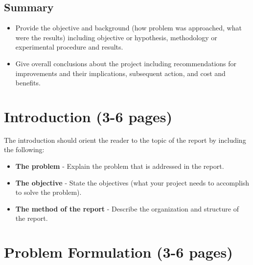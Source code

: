 \documentclass[12pt]{article}
\begin{document}
\subsection*{Summary}
\begin{itemize}[noitemsep]
    \item Provide the objective and background (how problem was approached, what were the results) including objective or hypothesis, methodology or experimental procedure and results.
    \item Give overall conclusions about the project including recommendations for improvements and their implications, subsequent action, and cost and benefits.
\end{itemize}

\tableofcontents
\newpage

\section{Introduction (3-6 pages)}
The introduction should orient the reader to the topic of the report by including the following:
\begin{itemize}[noitemsep]
    \item \textbf{The problem} - Explain the problem that is addressed in the report.
    \item \textbf{The objective} - State the objectives (what your project needs to accomplish to solve the problem).
    \item \textbf{The method of the report} - Describe the organization and structure of the report.
\end{itemize}

\section{Problem Formulation (3-6 pages)}
\end{document}
